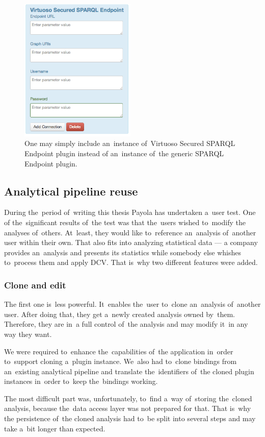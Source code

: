 \begin{figure}
	\centering
	\includegraphics[width=55mm]{img/secured.png}
	\caption{One may simply include an~instance of~Virtuoso Secured SPARQL Endpoint plugin instead
	of an~instance of~the generic SPARQL Endpoint plugin.}
	\label{fig:secured-ds}
\end{figure}

\subsection{Analytical pipeline reuse}
During the~period of~writing this thesis Payola has undertaken a~user test. One 
of the~significant results of~the test was that the~users wished to~modify the
analyses of~others. At~least, they would like to~reference an~analysis of~another user within their own. That also fits into analyzing statistical data --- 
a company provides an~analysis and presents its statistics while somebody else 
whishes to~process them and apply DCV. That is~why two different features 
were added.

\subsubsection{Clone and edit}
The first one is~less powerful. It~enables the~user to~clone an~analysis of~another user. After doing that, they get a~newly created analysis owned by~them. Therefore, they are in~a full control of~the analysis and may modify it~in 
any way they want.

We were required to~enhance the~capabilities of~the application in~order to~support cloning a~plugin instance. We~also had to~clone bindings from an~existing analytical pipeline and translate the~identifiers of~the cloned plugin 
instances in~order to~keep the~bindings working.

The most difficult part was, unfortunately, to~find a~way of~storing the~cloned 
analysis, because the~data access layer was not prepared for that. That is~why
the persistence of~the cloned analysis had to~be split into several steps and may take a~bit longer than expected.

